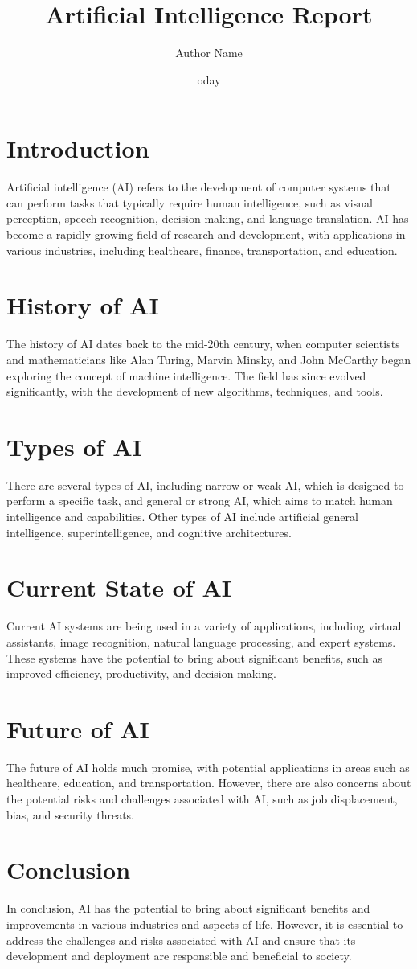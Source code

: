 \documentclass{article}
\title{Artificial Intelligence Report}
\author{Author Name}
\date{	oday}
\begin{document}
\maketitle

\section{Introduction}
Artificial intelligence (AI) refers to the development of computer systems that can perform tasks that typically require human intelligence, such as visual perception, speech recognition, decision-making, and language translation. AI has become a rapidly growing field of research and development, with applications in various industries, including healthcare, finance, transportation, and education.

\section{History of AI}
The history of AI dates back to the mid-20th century, when computer scientists and mathematicians like Alan Turing, Marvin Minsky, and John McCarthy began exploring the concept of machine intelligence. The field has since evolved significantly, with the development of new algorithms, techniques, and tools.

\section{Types of AI}
There are several types of AI, including narrow or weak AI, which is designed to perform a specific task, and general or strong AI, which aims to match human intelligence and capabilities. Other types of AI include artificial general intelligence, superintelligence, and cognitive architectures.

\section{Current State of AI}
Current AI systems are being used in a variety of applications, including virtual assistants, image recognition, natural language processing, and expert systems. These systems have the potential to bring about significant benefits, such as improved efficiency, productivity, and decision-making.

\section{Future of AI}
The future of AI holds much promise, with potential applications in areas such as healthcare, education, and transportation. However, there are also concerns about the potential risks and challenges associated with AI, such as job displacement, bias, and security threats.

\section{Conclusion}
In conclusion, AI has the potential to bring about significant benefits and improvements in various industries and aspects of life. However, it is essential to address the challenges and risks associated with AI and ensure that its development and deployment are responsible and beneficial to society.
\end{document}
